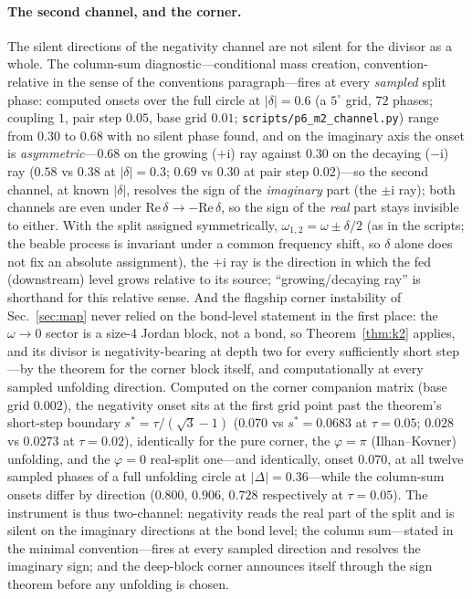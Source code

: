 ﻿\documentclass[11pt]{article}
\newcommand{\ii}{\mathrm{i}}
\theoremstyle{remark}
\begin{document}
\paragraph{The second channel, and the corner.} The silent
directions of the negativity channel are not silent for the
divisor as a whole. The column-sum diagnostic---conditional mass
creation, convention-relative in the sense of the conventions
paragraph---fires at every \emph{sampled} split phase: computed
onsets
over the full circle at $|\delta|=0.6$ (a $5^\circ$ grid, $72$
phases; coupling $1$, pair step
$0.05$, base grid $0.01$; \texttt{scripts/p6\_m2\_channel.py}) range from
$0.30$ to $0.68$ with no silent phase found, and on the imaginary
axis
the onset is \emph{asymmetric}---$0.68$ on the growing ($+\ii$)
ray against $0.30$ on the decaying ($-\ii$) ray ($0.58$ vs $0.38$
at $|\delta|=0.3$; $0.69$ vs $0.30$ at pair step $0.02$)---so the
second channel, at known $|\delta|$, resolves the sign of the
\emph{imaginary} part (the $\pm\ii$ ray); both channels are even under $\mathrm{Re}\,\delta\to-\mathrm{Re}\,\delta$,
so the sign of the \emph{real} part stays invisible to either. With the split assigned
symmetrically, $\omega_{1,2}=\omega\pm\delta/2$ (as in the scripts;
the beable process is invariant under a common frequency shift, so
$\delta$ alone does not fix an absolute assignment), the $+\ii$ ray
is the direction in which the fed (downstream) level grows relative
to its source; ``growing/decaying ray'' is shorthand for this
relative sense. And the flagship corner instability of Sec.~\ref{sec:map}
never relied on the bond-level statement in the first place: the
$\omega\to0$ sector is a size-4 Jordan block, not a bond, so
Theorem~\ref{thm:k2} applies, and its divisor is
negativity-bearing at depth two for every sufficiently short
step---by the theorem for the corner block itself, and
computationally at every sampled unfolding direction. Computed on
the corner companion matrix (base grid $0.002$), the negativity
onset sits at the first grid point past the theorem's short-step
boundary
$s^*=\tau/(\sqrt3-1)$ ($0.070$ vs $s^*=0.0683$ at $\tau=0.05$;
$0.028$ vs $0.0273$ at $\tau=0.02$), identically for the pure
corner, the $\varphi=\pi$ (Ilhan--Kovner) unfolding, and the
$\varphi=0$ real-split one---and identically, onset $0.070$, at
all twelve sampled phases of a full unfolding circle at
$|\Delta|=0.36$---while the column-sum onsets differ by
direction ($0.800$, $0.906$, $0.728$ respectively at
$\tau=0.05$).
The instrument is thus two-channel: negativity reads the real part
of the split and is silent on the imaginary directions at the bond
level; the column sum---stated in the minimal convention---fires
at every sampled direction and resolves the imaginary sign; and
the deep-block
corner announces itself through the sign theorem before any
unfolding is chosen.
\end{document}

